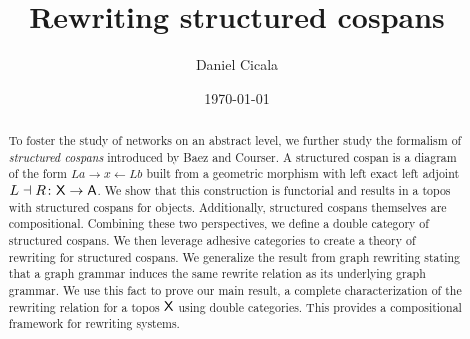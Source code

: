 \author{Daniel Cicala}
\title{Rewriting structured cospans}
\date{\today}
\address{Department of Mathematics and Physics\\
  University of New Haven}
\maketitle

\begin{abstract}
  To foster the study of networks on an abstract level, we
  further study the formalism of \emph{structured cospans}
  introduced by Baez and Courser. A structured cospan is a
  diagram of the form $ La \to x \gets Lb $ built from a
  geometric morphism with left exact left adjoint
  $ L \dashv R \colon \mathsf{X} \to \mathsf{A} $.  We show that this
  construction is functorial and results in a topos with
  structured cospans for objects.  Additionally, structured
  cospans themselves are compositional. Combining these two
  perspectives, we define a double category of structured
  cospans.  We then leverage adhesive categories to create a
  theory of rewriting for structured cospans. We generalize
  the result from graph rewriting stating that a graph
  grammar induces the same rewrite relation as its
  underlying graph grammar.  We use this fact to prove our
  main result, a complete characterization of the rewriting
  relation for a topos $ \mathsf{X} $ using double categories.  This
  provides a compositional framework for rewriting systems.
\end{abstract}
